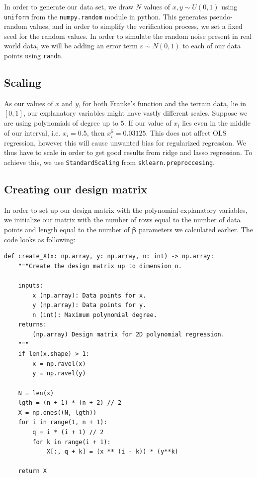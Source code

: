 \documentclass{article}
\begin{document}
In order to generate our data set, we draw $N$ values of $x,y \sim U(0, 1)$ using \verb|uniform| from the \verb|numpy.random| module in python. This generates pseudo-random values, and in order to simplify the verification process, we set a fixed seed for the random values. In order to simulate the random noise present in real world data, we will be adding an error term $\varepsilon \sim N(0,1)$ to each of our data points using \verb|randn|.

\subsection{Scaling}

As our values of $x$ and $y$, for both Franke's function and the terrain data,  lie in $[0, 1]$, our explanatory variables might have vastly different scales. Suppose we are using polynomials of degree up to $5$. If our value of $x_i$ lies even in the middle of our interval, i.e. $x_i = 0.5$, then $x_i^5 = 0.03125$. This does not affect OLS regression, however this will cause unwanted bias for regularized regression. We thus have to scale in order to get good results from ridge and lasso regression. To achieve this, we use \verb|StandardScaling| from \verb|sklearn.preproccesing|.

\subsection{Creating our design matrix}
In order to set up our design matrix with the polynomial explanatory variables, we initialize our matrix with the number of rows equal to the number of data points and length equal to the number of $\boldsymbol{\beta}$ parameters we calculated earlier. The code looks as following:
\begin{verbatim}
def create_X(x: np.array, y: np.array, n: int) -> np.array:
    """Create the design matrix up to dimension n.

    inputs:
        x (np.array): Data points for x.
        y (np.array): Data points for y.
        n (int): Maximum polynomial degree.
    returns:
        (np.array) Design matrix for 2D polynomial regression.
    """
    if len(x.shape) > 1:
        x = np.ravel(x)
        y = np.ravel(y)

    N = len(x)
    lgth = (n + 1) * (n + 2) // 2
    X = np.ones((N, lgth))
    for i in range(1, n + 1):
        q = i * (i + 1) // 2
        for k in range(i + 1):
            X[:, q + k] = (x ** (i - k)) * (y**k)

    return X
\end{verbatim}
\end{document}
